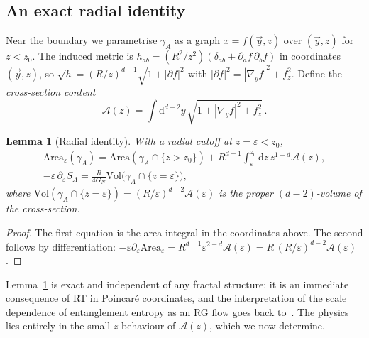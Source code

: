 \documentclass[11pt]{article}
\newtheorem{lemma}{Lemma}
\theoremstyle{definition}\newtheorem{definition}{Definition}[section]
\theoremstyle{remark}\newtheorem*{remark}{Remark}
\newcommand{\cA}{\mathcal{A}}
\newcommand{\dd}{\mathrm{d}}
\newcommand{\Vol}{\mathrm{Vol}}
\newcommand{\Area}{\mathrm{Area}}
\newcommand{\GN}{G_N}
\begin{document}
\subsection{An exact radial identity}
Near the boundary we parametrise $\gamma_A$ as a graph $x=f(\vec y,z)$ over $(\vec y,z)$ for $z<z_0$. The induced
metric is $h_{ab}=(R^2/z^2)(\delta_{ab}+\partial_af\,\partial_bf)$ in coordinates $(\vec y,z)$, so
$\sqrt{h}=(R/z)^{d-1}\sqrt{1+|\partial f|^2}$ with $|\partial f|^2=|\nabla_yf|^2+f_z^2$. Define the
\emph{cross-section content}
\begin{equation}
\cA(z)=\int\dd^{d-2}y\,\sqrt{1+|\nabla_yf|^2+f_z^2}\,.
\label{eq:content}
\end{equation}
\begin{lemma}[Radial identity]
\label{lem:radial}
With a radial cutoff at $z=\varepsilon<z_0$,
\begin{equation}
\begin{gathered}
\Area_\varepsilon(\gamma_A)=\Area(\gamma_A\cap\{z>z_0\})+R^{d-1}\int_\varepsilon^{z_0}\dd z\,z^{1-d}\cA(z),\\
-\varepsilon\,\partial_\varepsilon S_A=\frac{R}{4\GN}\Vol\big(\gamma_A\cap\{z=\varepsilon\}\big),
\end{gathered}
\label{eq:radial}
\end{equation}
where $\Vol(\gamma_A\cap\{z=\varepsilon\})=(R/\varepsilon)^{d-2}\cA(\varepsilon)$ is the proper
$(d-2)$-volume of the cross-section.
\end{lemma}
\begin{proof}
The first equation is the area integral in the coordinates above. The second follows by differentiation:
$-\varepsilon\partial_\varepsilon\Area_\varepsilon=R^{d-1}\varepsilon^{2-d}\cA(\varepsilon)=R\,(R/\varepsilon)^{d-2}\cA(\varepsilon)$.
\end{proof}
Lemma~\ref{lem:radial} is exact and independent of any fractal structure; it is an immediate consequence
of RT in Poincar\'e coordinates, and the interpretation of the scale dependence of entanglement entropy as an
RG flow goes back to~\cite{LiuMezei}. The physics lies entirely in the small-$z$ behaviour of $\cA(z)$,
which we now determine.
\end{document}

